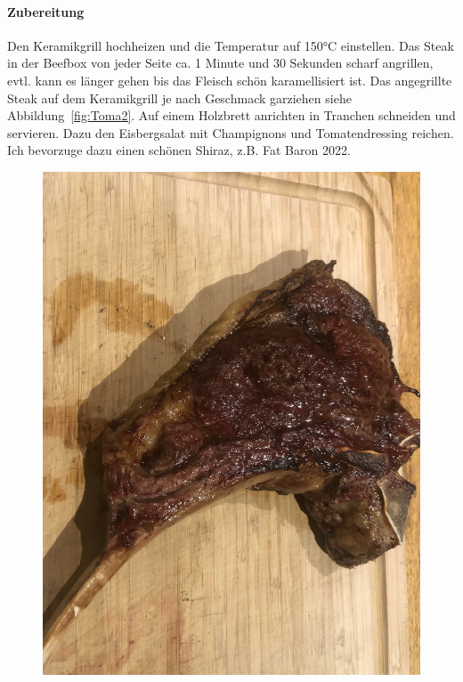 \paragraph{Zubereitung}

Den Keramikgrill hochheizen und die Temperatur auf 150°C einstellen.
Das Steak in der Beefbox von jeder Seite ca. 1 Minute und 30 Sekunden scharf 
angrillen, evtl. kann es länger gehen bis das Fleisch schön karamellisiert ist.
Das angegrillte Steak auf dem Keramikgrill je nach Geschmack garziehen siehe 
Abbildung~\vref{fig:Toma2}. Auf einem Holzbrett anrichten in Tranchen 
schneiden und servieren.
Dazu den Eisbergsalat mit Champignons und Tomatendressing reichen.
Ich bevorzuge dazu einen schönen Shiraz, z.B. Fat Baron 2022.
\newpage

\begin{figure}[htbp]
	\centering
	\begin{minipage}{1\textwidth}
	\centering
	\includegraphics[width=.9\linewidth]{pics/Tomahawk_gegrillt}
	\label{fig:Toma2}
	\end{minipage}
\end{figure}
\newpage

